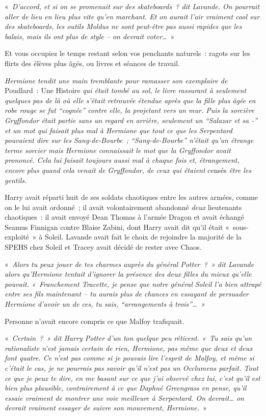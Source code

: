 «~\emph{D'accord, et si on se promenait sur des skateboards~? dit Lavande.
On pourrait aller de lieu en lieu plus vite qu'en marchant.
Et on aurait l'air vraiment cool sur des skateboards, les outils Moldus ne sont peut-être pas aussi rapides que les balais, mais ils ont plus de style -- on devrait voter…}~»

Et vous occupiez le temps restant selon vos penchants naturels~: ragots sur les flirts des élèves plus âgés, ou livres et séances de travail.

\emph{Hermione tendit une main tremblante pour ramasser son exemplaire de} Poudlard~: Une Histoire \emph{qui était tombé au sol, le livre rassurant à seulement quelques pas de là où elle s'était retrouvée étendue après que la fille plus âgée en robe rouge se fut “cognée” contre elle, la projetant vers un mur.
Puis la sorcière Gryffondor était partie sans un regard en arrière, seulement un “Salazar et sa -” et un mot qui faisait plus mal à Hermione que tout ce que les Serpentard pouvaient dire sur les Sang-de-Bourbe~; “Sang-de-Bourbe” n'était qu'un étrange terme sorcier mais Hermione connaissait le mot que la Gryffondor avait prononcé.
Cela lui faisait toujours aussi mal à chaque fois et, étrangement, encore plus quand cela venait de Gryffondor, de ceux qui étaient} censés \emph{être les gentils.}

Harry avait réparti huit de ses soldats chaotiques entre les autres armées, comme on le lui avait ordonné~; il avait volontairement abandonné \emph{deux} lieutenants chaotiques~: il avait envoyé Dean Thomas à l'armée Dragon et avait échangé Seamus Finnigan contre Blaise Zabini, dont Harry avait dit qu'il était «~sous-exploité~» à Soleil.
Lavande avait fait le choix de rejoindre la majorité de la SPEHS chez Soleil et Tracey avait décidé de rester avec Chaos.

«~\emph{Alors tu peux jouer de tes charmes auprès du général Potter~?~»
dit Lavande alors qu'Hermione tentait d'ignorer la présence des deux filles du mieux qu'elle pouvait.
«~Franchement Tracette, je pense que notre général Soleil l'a bien attrapé entre ses fils maintenant -- tu aurais plus de chances en essayant de persuader Hermione d'avoir un de ces, tu sais, “arrangements à trois”…~»}

Personne n'avait encore compris ce que Malfoy trafiquait.

«~\emph{Certain~?~»
dit Harry Potter d'un ton quelque peu réticent.
«~Tu sais qu'un rationaliste n'est jamais certain de rien, Hermione, pas même que deux et deux font quatre.
Ce n'est pas comme si je pouvais lire l'esprit de Malfoy, et même si c'était le cas, je ne pourrais pas savoir qu'il n'est pas un Occlumens parfait.
Tout ce que je peux te dire, en me basant sur ce que j'ai observé chez lui, c'est qu'il est bien plus plausible, contrairement à ce que Daphné Greengrass en pense, qu'il essaie vraiment de montrer une voie meilleure à Serpentard.
On devrait… on devrait vraiment essayer de suivre son mouvement, Hermione.}~»

